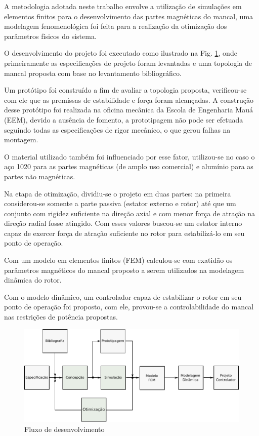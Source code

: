 A metodologia adotada neste trabalho envolve a utilização de simulações em elementos finitos para o desenvolvimento das partes magnéticas do mancal, uma modelagem fenomenológica foi feita para a realização da otimização dos parâmetros físicos do sistema. 

O desenvolvimento do projeto foi executado como ilustrado na Fig. \ref{fig:metodologia:fluxo:dev}, onde primeiramente as especificações de projeto foram levantadas e uma topologia de mancal proposta com base no levantamento bibliográfico. 

Um protótipo foi construído a fim de avaliar a topologia proposta, verificou-se com ele que as premissas de estabilidade e força foram alcançadas. A construção desse protótipo foi realizada na oficina mecânica da Escola de Engenharia Mauá (EEM), devido a ausência de fomento, a prototipagem não pode ser efetuada seguindo todas as especificações de rigor mecânico, o que gerou falhas na montagem.

O material utilizado também foi influenciado por esse fator, utilizou-se no caso o aço 1020 para as partes magnéticas (de amplo uso comercial) e alumínio para as partes não magnéticas. 

Na etapa de otimização, dividiu-se o projeto em duas partes: na primeira considerou-se somente a parte passiva (estator externo e rotor) até que um conjunto com rigidez suficiente na direção axial e com menor força de atração na direção radial fosse atingido. Com esses valores buscou-se um estator interno capaz de exercer força de atração suficiente no rotor para estabilizá-lo em seu ponto de operação.

Com um modelo em elementos finitos (FEM) calculou-se com exatidão os parâmetros magnéticos do mancal proposto a serem utilizados na modelagem dinâmica do rotor.

Com o modelo dinâmico, um controlador capaz de estabilizar o rotor em seu ponto de operação foi proposto, com ele, provou-se a controlabilidade do mancal nas restrições de potência propostas. 


 
\begin{figure}[th!]
	\centering
	\includegraphics[width=1\linewidth]{Figs/metodologia_fluxo_dev}
	\caption{Fluxo de desenvolvimento}
	\label{fig:metodologia:fluxo:dev}
\end{figure} 
 
